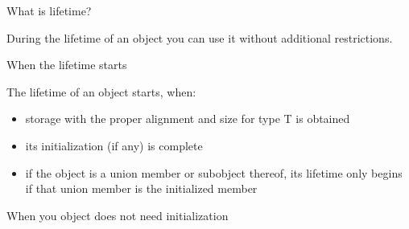 \documentclass{panicsoftware-presentation}
\makeatletter
\newenvironment{itemizeSeq}{\begin{itemize}[<+-|@alert+>]}{\end{itemize}}
\makeatother
\begin{document}
\begin{frame}{What is lifetime?}

\centerline{During the lifetime of an object you can use it without additional restrictions.}

\end{frame}


\begin{frame}{When the lifetime starts}

\centerline{The lifetime of an object starts, when:}

\begin{itemizeSeq}

\item storage with the proper alignment and size for type T is obtained
\item its initialization \alert{(if any)} is complete
\item if the object is a union member or subobject thereof, its lifetime only begins if that union member is the initialized member

\end{itemizeSeq}

\begin{frame}{When you object does not need initialization}




\end{frame}


\end{frame}
\end{document}
